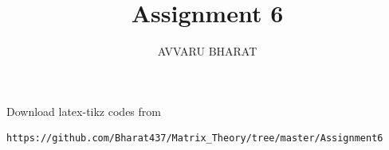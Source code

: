 \documentclass[journal,12pt,twocolumn]{IEEEtran}
\DeclareMathOperator*{\Res}{Res}
\begin{document}
\newtheorem{theorem}{Theorem}[section]
\newtheorem{problem}{Problem}
\newtheorem{proposition}{Proposition}[section]
\newtheorem{lemma}{Lemma}[section]
\newtheorem{corollary}[theorem]{Corollary}
\newtheorem{example}{Example}[section]
\newtheorem{definition}[problem]{Definition}

\newcommand{\BEQA}{\begin{eqnarray}}
\newcommand{\EEQA}{\end{eqnarray}}
\newcommand{\define}{\stackrel{\triangle}{=}}

\providecommand{\mbf}{\mathbf}
\providecommand{\pr}[1]{\ensuremath{\Pr\left(#1\right)}}
\providecommand{\qfunc}[1]{\ensuremath{Q\left(#1\right)}}
\providecommand{\sbrak}[1]{\ensuremath{{}\left[#1\right]}}
\providecommand{\lsbrak}[1]{\ensuremath{{}\left[#1\right.}}
\providecommand{\rsbrak}[1]{\ensuremath{{}\left.#1\right]}}
\providecommand{\brak}[1]{\ensuremath{\left(#1\right)}}
\providecommand{\lbrak}[1]{\ensuremath{\left(#1\right.}}
\providecommand{\rbrak}[1]{\ensuremath{\left.#1\right)}}
\providecommand{\cbrak}[1]{\ensuremath{\left\{#1\right\}}}
\providecommand{\lcbrak}[1]{\ensuremath{\left\{#1\right.}}
\providecommand{\rcbrak}[1]{\ensuremath{\left.#1\right\}}}
\theoremstyle{remark}
\newtheorem{rem}{Remark}
\newcommand{\sgn}{\mathop{\mathrm{sgn}}}
\providecommand{\abs}[1]{\left\vert#1\right\vert}
\providecommand{\res}[1]{\Res\displaylimits_{#1}} 
\providecommand{\norm}[1]{\left\lVert#1\right\rVert}
\providecommand{\mtx}[1]{\mathbf{#1}}
\providecommand{\mean}[1]{E\left[ #1 \right]}
\providecommand{\fourier}{\overset{\mathcal{F}}{ \rightleftharpoons}}
\providecommand{\system}{\overset{\mathcal{H}}{ \longleftrightarrow}}
\newcommand{\solution}{\noindent \textbf{Solution: }}
\newcommand{\cosec}{\,\text{cosec}\,}
\providecommand{\dec}[2]{\ensuremath{\overset{#1}{\underset{#2}{\gtrless}}}}
\newcommand{\myvec}[1]{\ensuremath{\begin{pmatrix}#1\end{pmatrix}}}
\newcommand{\mydet}[1]{\ensuremath{\begin{vmatrix}#1\end{vmatrix}}}
\makeatletter
{}
\makeatother
\let\StandardTheFigure\thefigure
\let\vec\mathbf
\renewcommand{\thefigure}{\theproblem}
\def\putbox#1#2#3{\makebox[0in][l]{\makebox[#1][l]{}\raisebox{\baselineskip}[0in][0in]{\raisebox{#2}[0in][0in]{#3}}}}
     \def\rightbox#1{\makebox[0in][r]{#1}}
     \def\centbox#1{\makebox[0in]{#1}}
     \def\topbox#1{\raisebox{-\baselineskip}[0in][0in]{#1}}
     \def\midbox#1{\raisebox{-0.5\baselineskip}[0in][0in]{#1}}
\vspace{3cm}
\title{Assignment 6}
\author{AVVARU BHARAT}
\maketitle
\newpage
\bigskip
\renewcommand{\thefigure}{1}
\renewcommand{\thetable}{\theenumi}
Download latex-tikz codes from 
%
\begin{lstlisting}
https://github.com/Bharat437/Matrix_Theory/tree/master/Assignment6
\end{lstlisting}
\end{document}
